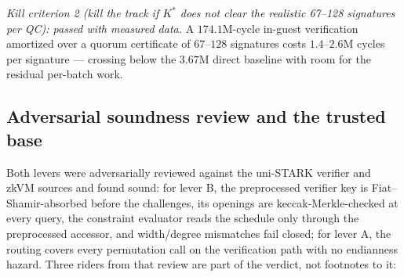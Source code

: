 \documentclass[11pt]{article}
\newcommand{\mldsa}{ML\mbox{-}DSA\mbox{-}65}
\theoremstyle{plain}
\theoremstyle{definition}
\theoremstyle{remark}
\begin{document}
\begin{table}[ht]\centering
{}
\caption{Measured in-guest verification cost of the native AIR proofs
(rv32im executor cycle counts from the embedded guest build; host prove
times in the text). $K^\ast = V_{\mathrm{fri}} / 3.67$M is the crossover
against direct in-zkVM \mldsa{} verification at the post-S1 baseline. The
M1pp figure assumes the baked verifier key of
Section~\ref{sec:air-soundness}.}
\label{tab:airverify}
\end{table}

\emph{Kill criterion 2 (kill the track if $K^\ast$ does not clear the
realistic 67--128 signatures per QC): passed with measured data.} A
$174.1$M-cycle in-guest verification amortized over a quorum certificate of
$67$--$128$ signatures costs $1.4$--$2.6$M cycles per signature ---
crossing below the $3.67$M direct baseline with room for the residual
per-batch work.

\subsection{Adversarial soundness review and the trusted base}
\label{sec:air-soundness}

Both levers were adversarially reviewed against the uni-STARK verifier and
zkVM sources and found sound: for lever B, the preprocessed verifier key is
Fiat--Shamir-absorbed before the challenges, its openings are
keccak-Merkle-checked at every query, the constraint evaluator reads the
schedule only through the preprocessed accessor, and width/degree
mismatches fail closed; for lever A, the routing covers every permutation
call on the verification path with no endianness hazard. Three riders from
that review are part of the verdict, not footnotes to it:
\end{document}

